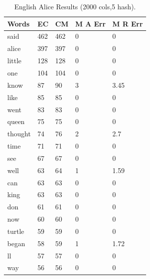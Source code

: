 \documentclass[shortpaper]{revdetua}
\begin{document}
\begin{table}[h]
    \centering
    \begin{tabular}{|l|l|l|l|l|}
    \hline
    Words     & EC & CM & M A Err & M R Err \\ \hline
    said    & 462 & 462    & 0           & 0           \\ \hline
    alice   & 397 & 397    & 0           & 0           \\ \hline
    little  & 128 & 128    & 0           & 0           \\ \hline
    one     & 104 & 104    & 0           & 0           \\ \hline
    know    & 87  & 90     & 3           & 3.45        \\ \hline
    like    & 85  & 85     & 0           & 0           \\ \hline
    went    & 83  & 83     & 0           & 0           \\ \hline
    queen   & 75  & 75     & 0           & 0           \\ \hline
    thought & 74  & 76     & 2           & 2.7         \\ \hline
    time    & 71  & 71     & 0           & 0           \\ \hline
    see     & 67  & 67     & 0           & 0           \\ \hline
    well    & 63  & 64     & 1           & 1.59        \\ \hline
    can     & 63  & 63     & 0           & 0           \\ \hline
    king    & 63  & 63     & 0           & 0           \\ \hline
    don     & 61  & 61     & 0           & 0           \\ \hline
    now     & 60  & 60     & 0           & 0           \\ \hline
    turtle  & 59  & 59     & 0           & 0           \\ \hline
    began   & 58  & 59     & 1           & 1.72        \\ \hline
    ll      & 57  & 57     & 0           & 0           \\ \hline
    way     & 56  & 56     & 0           & 0           \\ \hline
    \end{tabular}
    \caption{English Alice Results (2000 cols,5 hash).}
    \label{tab:2}
\end{table}  

\end{document}

